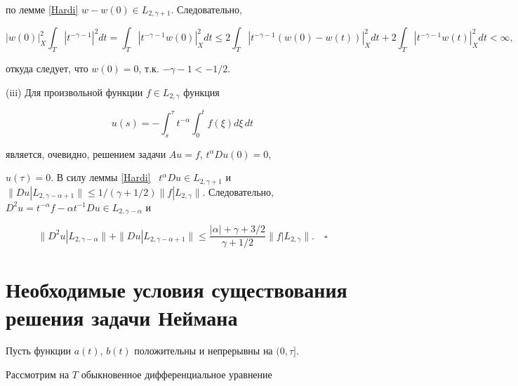 по лемме \ref{Hardi} $w-w(0) \in L_{2,\gamma+1}$. Следовательно,


$$


{|w(0)|}_X^2 \int_T |t^{-\gamma-1}|^2 d t=


\int_T {|t^{-\gamma-1} w(0)|}_X^2 d t \le


%


2 \int_T {|t^{-\gamma-1} (w(0)-w(t))|}_X^2 d t + 2


\int_T {|t^{-\gamma-1} w(t)|}_X^2 d t < \infty,


$$


откуда следует, что $w(0)=0$, т.к. $-\gamma-1 < -1/2$.





(iii) Для произвольной функции $f \in L_{2,\gamma}$  функция


$$


u(s) = -\int_s^\tau t^{-\alpha} \int_0^t f(\xi)d\xi\, dt


$$


является, очевидно, решением задачи $Au=f$, $t^\alpha Du(0)=0$,


$u(\tau)=0$. В силу леммы \ref{Hardi} \ $t^\alpha Du \in


L_{2,\gamma+1}$ и $\|Du|L_{2,\gamma-\alpha+1}\| \le 1/(\gamma+1/2)


\|f|L_{2,\gamma}\|$. Следовательно, $D^2u=t^{-\alpha} f-\alpha


t^{-1} Du \in L_{2,\gamma-\alpha}$ и


$$


\|D^2u|L_{2,\gamma-\alpha}\| + \|Du|L_{2,\gamma-\alpha+1}\| \le


\frac{|\alpha|+\gamma+3/2}{\gamma+1/2} \|f|L_{2,\gamma}\|. \quad


\square


$$











\section{Необходимые условия существования решения задачи Неймана}





Пусть функции $a(t)$, $b(t)$ положительны и непрерывны на $(0,\tau]$.


Рассмотрим на $T$ обыкновенное дифференциальное уравнение


